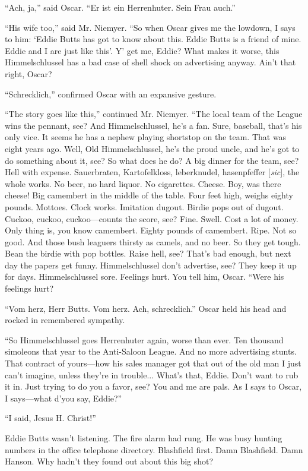 \documentclass[twoside,nohyper,openany,nobib]{tufte-book}
\begin{document}
``Ach, ja,'' said Oscar. ``Er ist ein Herrenhuter. Sein Frau auch.''

``His wife too,'' said Mr. Niemyer. ``So when Oscar gives me the
lowdown, I says to him: `Eddie Butts has got to know about this. Eddie
Butts is a friend of mine. Eddie and I are just like this'. Y' get me,
Eddie? What makes it worse, this Himmelschlussel has a bad case of shell
shock on advertising anyway. Ain't that right, Oscar?

``Schrecklich,'' confirmed Oscar with an expansive gesture.

``The story goes like this,'' continued Mr. Niemyer. ``The local team of
the League wins the pennant, see? And Himmelschlussel, he's a fan. Sure,
baseball, that's his only vice. It seems he has a nephew playing
shortstop on the team. That was eight years ago. Well, Old
Himmelschlussel, he's the proud uncle, and he's got to do something
about it, see? So what does he do? A big dinner for the team, see? Hell
with expense. Sauerbraten, Kartofelkloss, leberknudel, hasenpfeffer [\emph{sic}], the
whole works. No beer, no hard liquor. No cigarettes. Cheese. Boy, was
there cheese! Big camembert in the middle of the table. Four feet high,
weighs eighty pounds. Mottoes. Clock works. Imitation dugout. Birdie
pops out of dugout. Cuckoo, cuckoo, cuckoo---counts the score, see?
Fine. Swell. Cost a lot of money. Only thing is, you know camembert.
Eighty pounds of camembert. Ripe. Not so good. And those bush leaguers
thirsty as camels, and no beer. So they get tough. Bean the birdie with
pop bottles. Raise hell, see? That's bad enough, but next day the papers
get funny. Himmelschlussel don't advertise, see? They keep it up for
days. Himmelschlussel sore. Feelings hurt. You tell him, Oscar. ``Were
his feelings hurt?

``Vom herz, Herr Butts. Vom herz. Ach, schrecklich.'' Oscar held his
head and rocked in remembered sympathy.

``So Himmelschlussel goes Herrenhuter again, worse than ever. Ten
thousand simoleons that year to the Anti-Saloon League. And no more
advertising stunts. That contract of yours---how his sales manager got
that out of the old man I just can't imagine, unless they're in
trouble... What's that, Eddie. Don't want to rub it in. Just trying to
do you a favor, see? You and me are pals. As I says to Oscar, I
says---what d'you say, Eddie?''

``I said, Jesus H. Christ!''

Eddie Butts wasn't listening. The fire alarm had rung. He was busy
hunting numbers in the office telephone directory. Blashfield first.
Damn Blashfield. Damn Hanson. Why hadn't they found out about this big
shot?
\end{document}
